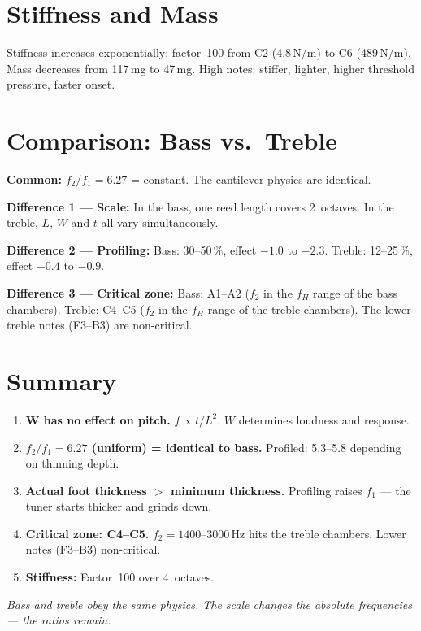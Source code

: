 \documentclass[11pt,a4paper]{article}
\begin{document}
\section{Stiffness and Mass}

Stiffness increases exponentially: factor~100 from C2 (4.8\,N/m) to
C6 (489\,N/m). Mass decreases from 117\,mg to 47\,mg. High notes:
stiffer, lighter, higher threshold pressure, faster onset.

\section{Comparison: Bass vs.\ Treble}

\textbf{Common:} $f_2/f_1 = 6{.}27$ = constant. The cantilever physics
are identical.

\textbf{Difference 1 --- Scale:} In the bass, one reed length covers 2~octaves.
In the treble, $L$, $W$ and $t$ all vary simultaneously.

\textbf{Difference 2 --- Profiling:} Bass: 30--50\,\%, effect $-1{.}0$ to
$-2{.}3$. Treble: 12--25\,\%, effect $-0{.}4$ to $-0{.}9$.

\textbf{Difference 3 --- Critical zone:} Bass: A1--A2 ($f_2$ in the $f_H$ range
of the bass chambers). Treble: C4--C5 ($f_2$ in the $f_H$ range of the treble chambers).
The lower treble notes (F3--B3) are non-critical.

\section{Summary}

\begin{enumerate}
\item \textbf{W has no effect on pitch.} $f \propto t/L^2$.
  $W$ determines loudness and response.
\item \textbf{$f_2/f_1 = 6{.}27$ (uniform) = identical to bass.}
  Profiled: 5.3--5.8 depending on thinning depth.
\item \textbf{Actual foot thickness $>$ minimum thickness.} Profiling
  raises $f_1$ --- the tuner starts thicker and grinds down.
\item \textbf{Critical zone: C4--C5.} $f_2 = 1400$--$3000$\,Hz hits
  the treble chambers. Lower notes (F3--B3) non-critical.
\item \textbf{Stiffness:} Factor~100 over 4~octaves.
\end{enumerate}

\bigskip
\textit{Bass and treble obey the same physics.
The scale changes the absolute frequencies --- the ratios remain.}
\end{document}

